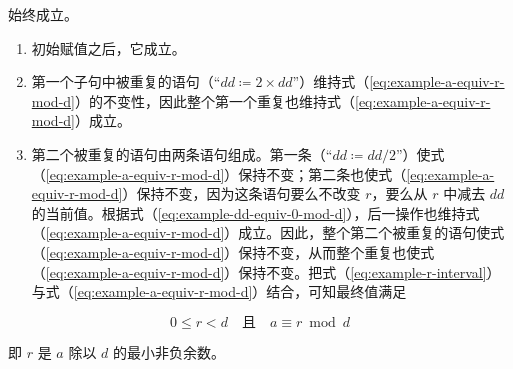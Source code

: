 \documentclass[twoside,11pt,fontset=none]{ctexbook}
\begin{document}
\noindent
始终成立。

\begin{enumerate}[wide, nosep, label=(\arabic*)]
	\item 初始赋值之后，它成立。
	\item 第一个子句中被重复的语句（“$dd \coloneq 2\times dd$”）维持式（\ref{eq:example-a-equiv-r-mod-d}）的不变性，因此整个第一个重复也维持式（\ref{eq:example-a-equiv-r-mod-d}）成立。
	\item 第二个被重复的语句由两条语句组成。第一条（“$dd \coloneq dd/2$”）使式（\ref{eq:example-a-equiv-r-mod-d}）保持不变；第二条也使式（\ref{eq:example-a-equiv-r-mod-d}）保持不变，因为这条语句要么不改变 $r$，要么从 $r$ 中减去 $dd$ 的当前值。根据式（\ref{eq:example-dd-equiv-0-mod-d}），后一操作也维持式（\ref{eq:example-a-equiv-r-mod-d}）成立。因此，整个第二个被重复的语句使式（\ref{eq:example-a-equiv-r-mod-d}）保持不变，从而整个重复也使式（\ref{eq:example-a-equiv-r-mod-d}）保持不变。把式（\ref{eq:example-r-interval}）与式（\ref{eq:example-a-equiv-r-mod-d}）结合，可知最终值满足
\end{enumerate}
\medskip
$$
0 \leqslant r < d\quad \text{且}\quad a \equiv r \bmod d
$$

\noindent
即 $r$ 是 $a$ 除以 $d$ 的最小非负余数。
\end{document}
